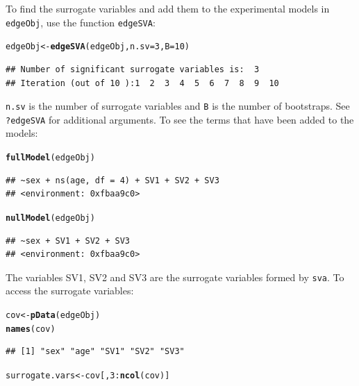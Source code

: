 \documentclass{article}\usepackage[]{graphicx}\usepackage[]{color}
\makeatletter
\newcommand{\hlnum}[1]{\textcolor[rgb]{0.686,0.059,0.569}{#1}}%
\newcommand{\hlopt}[1]{\textcolor[rgb]{0,0,0}{#1}}%
\newcommand{\hlstd}[1]{\textcolor[rgb]{0.345,0.345,0.345}{#1}}%
\newcommand{\hlkwb}[1]{\textcolor[rgb]{0.69,0.353,0.396}{#1}}%
\newcommand{\hlkwc}[1]{\textcolor[rgb]{0.333,0.667,0.333}{#1}}%
\newcommand{\hlkwd}[1]{\textcolor[rgb]{0.737,0.353,0.396}{\textbf{#1}}}%
\newenvironment{kframe}{%
 \def\at@end@of@kframe{}%
 \ifinner\ifhmode%
  \def\at@end@of@kframe{\end{minipage}}%
  \begin{minipage}{\columnwidth}%
 \fi\fi%
 \def\FrameCommand##1{\hskip\@totalleftmargin \hskip-\fboxsep
 \colorbox{shadecolor}{##1}\hskip-\fboxsep
     \hskip-\linewidth \hskip-\@totalleftmargin \hskip\columnwidth}%
 \MakeFramed {\advance\hsize-\width
   \@totalleftmargin\z@ \linewidth\hsize
   \@setminipage}}%
 {\par\unskip\endMakeFramed%
 \at@end@of@kframe}
\newenvironment{knitrout}{}{} %
\makeatother
\begin{document}
To find the surrogate variables and add them to the experimental models in {\tt edgeObj}, use the function {\tt edgeSVA}:
\begin{knitrout}
\color{fgcolor}\begin{kframe}
\begin{alltt}
\hlstd{edgeObj} \hlkwb{<-} \hlkwd{edgeSVA}\hlstd{(edgeObj,} \hlkwc{n.sv} \hlstd{=} \hlnum{3}\hlstd{,} \hlkwc{B} \hlstd{=} \hlnum{10}\hlstd{)}
\end{alltt}
\begin{verbatim}
## Number of significant surrogate variables is:  3 
## Iteration (out of 10 ):1  2  3  4  5  6  7  8  9  10
\end{verbatim}
\end{kframe}
\end{knitrout}
{\tt n.sv} is the number of surrogate variables and {\tt B} is the number of bootstraps. See {\tt ?edgeSVA} for additional arguments. To see the terms that have been added to the models:
\begin{knitrout}
\color{fgcolor}\begin{kframe}
\begin{alltt}
\hlkwd{fullModel}\hlstd{(edgeObj)}
\end{alltt}
\begin{verbatim}
## ~sex + ns(age, df = 4) + SV1 + SV2 + SV3
## <environment: 0xfbaa9c0>
\end{verbatim}
\begin{alltt}
\hlkwd{nullModel}\hlstd{(edgeObj)}
\end{alltt}
\begin{verbatim}
## ~sex + SV1 + SV2 + SV3
## <environment: 0xfbaa9c0>
\end{verbatim}
\end{kframe}
\end{knitrout}
The variables SV1, SV2 and SV3 are the surrogate variables formed by {\tt sva}. To access the surrogate variables:
\begin{knitrout}
\color{fgcolor}\begin{kframe}
\begin{alltt}
\hlstd{cov} \hlkwb{<-} \hlkwd{pData}\hlstd{(edgeObj)}
\hlkwd{names}\hlstd{(cov)}
\end{alltt}
\begin{verbatim}
## [1] "sex" "age" "SV1" "SV2" "SV3"
\end{verbatim}
\begin{alltt}
\hlstd{surrogate.vars} \hlkwb{<-} \hlstd{cov[,} \hlnum{3}\hlopt{:}\hlkwd{ncol}\hlstd{(cov)]}
\end{alltt}
\end{kframe}
\end{knitrout}
\end{document}
